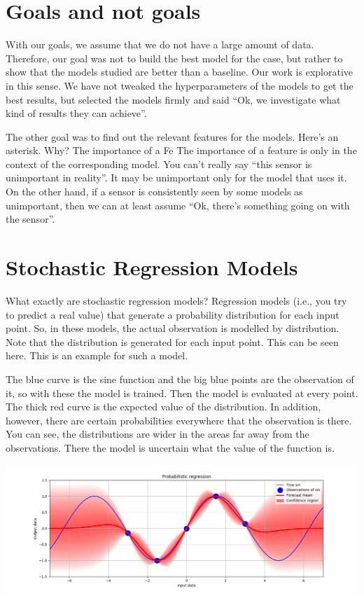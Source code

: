 \documentclass[margin=0.01in]{article}
\begin{document}
\section{Goals and not goals}
\label{sec:org18cd1b3}

With our goals, we assume that we do not have a large amount of data. Therefore, our goal was not to build the best model for the case, but rather to show that the models studied are better than a baseline. Our work is explorative in this sense. We have not tweaked the hyperparameters of the models to get the best results, but selected the models firmly and said ``Ok, we investigate what kind of results they can achieve''.

The other goal was to find out the relevant features for the models. Here's an asterisk. Why? The importance of a Fe  The importance of a feature is only in the context of the corresponding model. You can't really say ``this sensor is unimportant in reality''. It may be unimportant only for the model that uses it. On the other hand, if a sensor is consistently seen by some models as unimportant, then we can at least assume ``Ok, there's something going on with the sensor''.  

\section{Stochastic Regression Models}
\label{sec:org8ebb2ce}
What exactly are stochastic regression models? Regression models (i.e., you try to predict a real value) that generate a probability distribution for each input point. So, in these models, the actual observation is modelled by distribution. Note that the distribution is generated for each input point. This can be seen here. This is an example for such a model.

The blue curve is the sine function and the big blue points are the observation of it, so with these the model is trained. Then the model is evaluated at every point. The thick red curve is the expected value of the distribution. In addition, however, there are certain probabilities everywhere that the observation is there. You can see, the distributions are wider in the areas far away from the observations. There the model is uncertain what the value of the function is.

\begin{center}
\includegraphics[width=.9\linewidth]{../images/probabilistic_regression.png}
\end{center}
\end{document}
